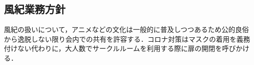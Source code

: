 \subsection*{風紀業務方針}

風紀の扱いについて，アニメなどの文化は一般的に普及しつつあるため公的良俗から逸脱しない限り会内での共有を許容する．コロナ対策はマスクの着用を義務付けない代わりに，大人数でサークルルームを利用する際に扉の開閉を呼びかける．


